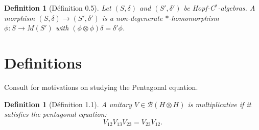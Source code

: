 \documentclass[a4paper,12pt]{article}
\theoremstyle{plain}
\newtheorem{definition}[proposition]{Definition}
\theoremstyle{definition}
\newcommand{\mc}{\mathcal}
\begin{document}
\begin{definition}[D\'efinition 0.5]
Let $(S,\delta)$ and $(S',\delta')$ be Hopf-C$^*$-algebras.  A \emph{morphism}
$(S,\delta) \rightarrow (S',\delta')$ is a non-degenerate $*$-homomorphism
$\phi:S\rightarrow M(S')$ with $(\phi\otimes\phi)\delta = \delta'\phi$.
\end{definition}

\section{Definitions}

Consult \cite{r30} for motivations on studying the Pentagonal equation.

\begin{definition}[D\'efinition 1.1]
A unitary $V\in\mc B(H\otimes H)$ is \emph{multiplicative} if it
satisfies the \emph{pentagonal equation}:
\[ V_{12} V_{13} V_{23} = V_{23} V_{12}. \]
\end{definition}
\end{document}
